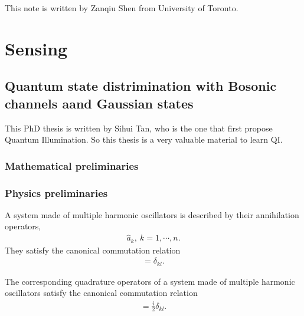 \documentclass[../../note.tex]{subfiles}
\begin{document}
This note is written by Zanqiu Shen from University of Toronto.

\chapter{Sensing}
\section{Quantum state distrimination with Bosonic channels aand Gaussian states}
This PhD thesis is written by Sihui Tan, who is the one that first propose Quantum Illumination. So this thesis is a very valuable material to learn QI.

\subsection{Mathematical preliminaries}
\begin{definition}
    
\end{definition}



\subsection{Physics preliminaries}
\begin{lemma}
    \label{lemma: communtation relations}
    A system made of multiple harmonic oscillators is described by their annihilation operators,
    \begin{align}
        \hat{a}_{k},~k=1,\cdots,n.
    \end{align}
    They satisfy the canonical commutation relation
    \begin{align}
        [\hat{a}_k, \hat{a}_l^\dagger] = \delta_{kl}.
    \end{align}
\end{lemma}

\begin{lemma}
    The corresponding quadrature operators of a system made of multiple harmonic oscillators satisfy the canonical commutation relation
    \begin{align}
        [\hat{q}_k, \hat{p}_l] = \frac{i}{2} \delta_{kl}.
    \end{align}
\end{lemma}
\end{document}
